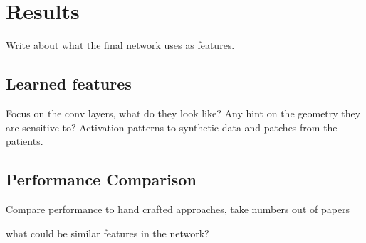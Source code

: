 \documentclass[main.tex]{subfiles}
\begin{document}
\chapter{Results}
Write about what the final network uses as features.
\section{Learned features}
Focus on the conv layers, what do they look like? Any hint on the geometry they are sensitive to?
Activation patterns to synthetic data and patches from the patients.

\section{Performance Comparison}
Compare performance to hand crafted approaches, 
take numbers out of papers

what could be similar features in the network?
\end{document}
